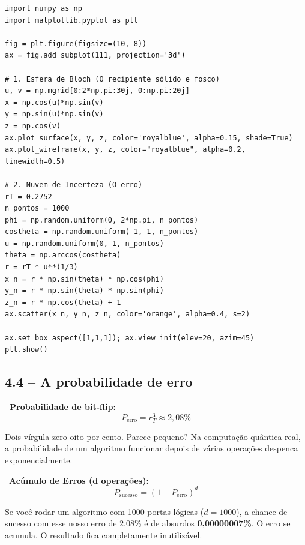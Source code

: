 \begin{lstlisting}[caption={Código para visualização 3D}]
import numpy as np
import matplotlib.pyplot as plt

fig = plt.figure(figsize=(10, 8))
ax = fig.add_subplot(111, projection='3d')

# 1. Esfera de Bloch (O recipiente sólido e fosco)
u, v = np.mgrid[0:2*np.pi:30j, 0:np.pi:20j]
x = np.cos(u)*np.sin(v)
y = np.sin(u)*np.sin(v)
z = np.cos(v)
ax.plot_surface(x, y, z, color='royalblue', alpha=0.15, shade=True)
ax.plot_wireframe(x, y, z, color="royalblue", alpha=0.2, linewidth=0.5)

# 2. Nuvem de Incerteza (O erro)
rT = 0.2752
n_pontos = 1000
phi = np.random.uniform(0, 2*np.pi, n_pontos)
costheta = np.random.uniform(-1, 1, n_pontos)
u = np.random.uniform(0, 1, n_pontos)
theta = np.arccos(costheta)
r = rT * u**(1/3)
x_n = r * np.sin(theta) * np.cos(phi)
y_n = r * np.sin(theta) * np.sin(phi)
z_n = r * np.cos(theta) + 1 
ax.scatter(x_n, y_n, z_n, color='orange', alpha=0.4, s=2)

ax.set_box_aspect([1,1,1]); ax.view_init(elev=20, azim=45)
plt.show()
\end{lstlisting}

\subsection{4.4 -- A probabilidade de erro}

\begin{mathblock}
\textbf{\color{corMath}\faSuperscript\ Probabilidade de bit-flip:}
\[
  P_{\text{erro}} = r_T^3 \approx 2{,}08\%
\]
\end{mathblock}

\begin{fala}
Dois vírgula zero oito por cento. Parece pequeno? Na computação quântica real, a probabilidade de um algoritmo funcionar depois de várias operações despenca exponencialmente.
\end{fala}

\begin{tela}
\faDesktop\ \textbf{Acúmulo de Erros (d operações):}
\[ P_{\text{sucesso}} = (1 - P_{\text{erro}})^d \]
\end{tela}

\begin{fala}
Se você rodar um algoritmo com 1000 portas lógicas ($d = 1000$), a chance de sucesso com esse nosso erro de 2,08\% é de absurdos \textbf{0,00000007\%}. O erro se acumula. O resultado fica completamente inutilizável.
\end{fala}